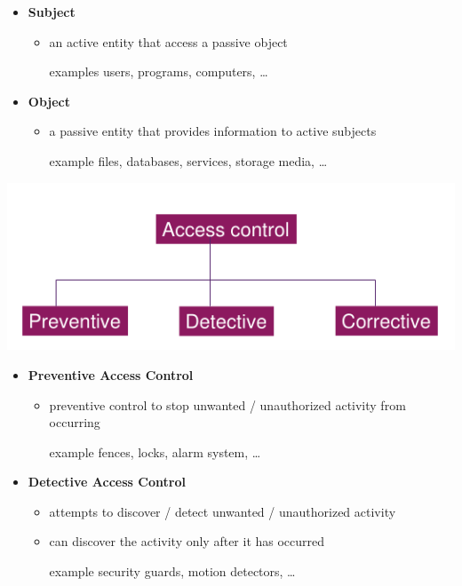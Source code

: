 \documentclass[11pt,twoside,landscape]{article}
\begin{document}
\begin{multicols}{4}
\begin{itemize}
\item \textbf{Subject}
\begin{itemize}
\item an active entity that access a passive object
\item[{examples}] users, programs, computers, \ldots{}
\end{itemize}

\item \textbf{Object}
\begin{itemize}
\item a passive entity that provides information to active subjects
\item[{example}] files, databases, services, storage media, \ldots{}
\end{itemize}
\end{itemize}


\begin{center}
\includegraphics[width=.9\linewidth]{static/img/cysec/primary_access_control_types.png}
\end{center}

\begin{itemize}
\item \textbf{Preventive Access Control}
\begin{itemize}
\item preventive control to stop unwanted / unauthorized activity from occurring
\item[{example}] fences, locks, alarm system, \ldots{}
\end{itemize}

\item \textbf{Detective Access Control}
\begin{itemize}
\item attempts to discover / detect unwanted / unauthorized activity
\item can discover the activity only after it has occurred
\item[{example }] security guards, motion detectors, \ldots{}
\end{itemize}


\end{itemize}
\end{multicols}
\end{document}
